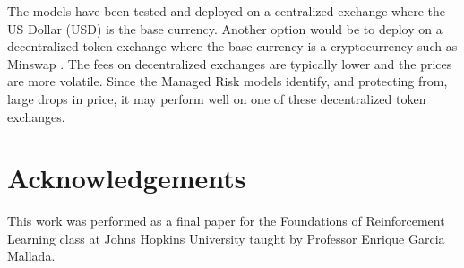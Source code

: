 \documentclass[journal]{new-aiaa}
\begin{document}
The models have been tested and deployed on a centralized exchange where the US Dollar (USD) is the base currency.
Another option would be to deploy on a decentralized token exchange where the base currency is a cryptocurrency such as Minswap \cite{nguyen2021mip}.
The fees on decentralized exchanges are typically lower and the prices are more volatile.
Since the Managed Risk models identify, and protecting from, large drops in price, it may perform well on one of these decentralized token exchanges.

\section*{Acknowledgements}\label{sec:Acknowledgements}
This work was performed as a final paper for the Foundations of Reinforcement Learning class at Johns Hopkins University taught by Professor Enrique Garcia Mallada.


\end{document}
